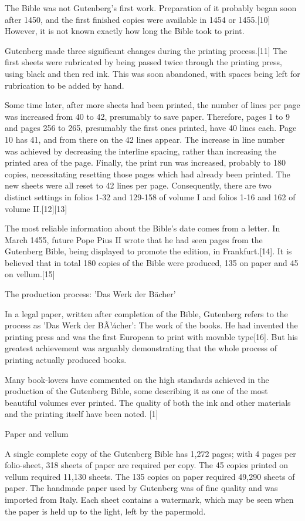 {{The Bible was not Gutenberg's first work.\cite{Man2002} Preparation of it probably began soon after 1450, and the first finished copies were available in 1454 or 1455.[10] However, it is not known exactly how long the Bible took to print.

Gutenberg made three significant changes during the printing process.[11] The first sheets were rubricated by being passed twice through the printing press, using black and then red ink. This was soon abandoned, with spaces being left for rubrication to be added by hand.

Some time later, after more sheets had been printed, the number of lines per page was increased from 40 to 42, presumably to save paper. Therefore, pages 1 to 9 and pages 256 to 265, presumably the first ones printed, have 40 lines each. Page 10 has 41, and from there on the 42 lines appear. The increase in line number was achieved by decreasing the interline spacing, rather than increasing the printed area of the page.
Finally, the print run was increased, probably to 180 copies, necessitating resetting those pages which had already been printed. The new sheets were all reset to 42 lines per page. Consequently, there are two distinct settings in folios 1-32 and 129-158 of volume I and folios 1-16 and 162 of volume II.[12][13]

The most reliable information about the Bible's date comes from a letter. In March 1455, future Pope Pius II wrote that he had seen pages from the Gutenberg Bible, being displayed to promote the edition, in Frankfurt.[14].
It is believed that in total 180 copies of the Bible were produced, 135 on paper and 45 on vellum.[15]

The production process: 'Das Werk der B\"acher'

In a legal paper, written after completion of the Bible, Gutenberg refers to the process as 'Das Werk der BÃ¼cher': The work of the books. He had invented the printing press and was the first European to print with movable type[16]. But his greatest achievement was arguably demonstrating that the whole process of printing actually produced books.

Many book-lovers have commented on the high standards achieved in the production of the Gutenberg Bible, some describing it as one of the most beautiful volumes ever printed. The quality of both the ink and other materials and the printing itself have been noted. [1]

Paper and vellum

A single complete copy of the Gutenberg Bible has 1,272 pages; with 4 pages per folio-sheet, 318 sheets of paper are required per copy. The 45 copies printed on vellum required 11,130 sheets. The 135 copies on paper required 49,290 sheets of paper. The handmade paper used by Gutenberg was of fine quality and was imported from Italy. Each sheet contains a watermark, which may be seen when the paper is held up to the light, left by the papermold.

}}
